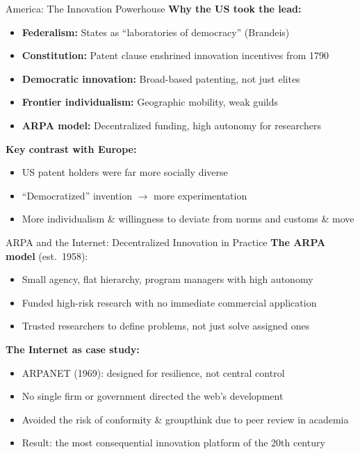 \documentclass[aspectratio=169, 11pt]{beamer}
\begin{document}
\begin{frame}{America: The Innovation Powerhouse}
    \textbf{Why the US took the lead:}
    \begin{itemize}
        \item \textbf{Federalism:} States as ``laboratories of democracy'' (Brandeis)
        \item \textbf{Constitution:} Patent clause enshrined innovation incentives from 1790
        \item \textbf{Democratic innovation:} Broad-based patenting, not just elites
        \item \textbf{Frontier individualism:} Geographic mobility, weak guilds
        \item \textbf{ARPA model:} Decentralized funding, high autonomy for researchers
    \end{itemize}

    \vspace{0.5em}
    \textbf{Key contrast with Europe:}
    \begin{itemize}
        \item US patent holders were far more socially diverse
        \item ``Democratized'' invention $\rightarrow$ more experimentation
        \item More individualism \& willingness to deviate from norms and customs \& move
    \end{itemize}
\end{frame}

\begin{frame}{ARPA and the Internet: Decentralized Innovation in Practice}
    \textbf{The ARPA model} (est.\ 1958):
    \begin{itemize}
        \item Small agency, flat hierarchy, program managers with high autonomy
        \item Funded high-risk research with no immediate commercial application
        \item Trusted researchers to define problems, not just solve assigned ones
    \end{itemize}

    \vspace{0.5em}

    \textbf{The Internet as case study:}
    \begin{itemize}
        \item ARPANET (1969): designed for resilience, not central control
        \item No single firm or government directed the web's development
        \item Avoided the risk of conformity \& groupthink due to peer review in academia
        \item Result: the most consequential innovation platform of the 20th century
    \end{itemize}
\end{frame}
\end{document}
